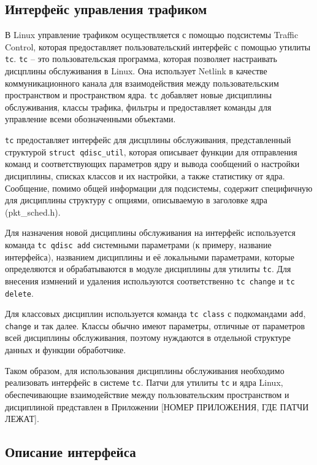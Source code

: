 	\subsection{Интерфейс управления трафиком}

	В Linux управление трафиком осуществляется с помощью подсистемы Traffic Control,
	которая предоставляет пользовательский интерфейс с помощью утилиты \texttt{tc}.
	\texttt{tc} -- это пользовательская программа, которая позволяет настраивать
	дисцплины обслуживания в Linux. Она использует Netlink в качестве
	коммуникационного канала для взаимодействия между пользовательским
	пространством и пространством ядра. \texttt{tc} добавляет новые дисциплины
	обслуживания, классы трафика, фильтры и предоставляет команды для
	управление всеми обозначенными объектами.\cite{tcpip}

	\texttt{tc} предоставляет интерфейс для дисцплины обслуживания,
	представленный структурой \lstinline{struct qdisc_util}, которая
	описывает функции для отправления команд и соответствующих параметров ядру
	и вывода сообщений о настройки дисциплины, списках классов и их настройки, а
	также статистику от ядра. Сообщение, помимо общей информации для подсистемы,
	содержит специфичную для дисциплины структуру с опциями, описываемую
	в заголовке ядра (pkt\_sched.h). 

	Для назначения новой дисциплины обслуживания на интерфейс используется
	команда \lstinline{tc qdisc add} системными параметрами (к примеру, название
	интерфейса), названием дисциплины и её локальными параметрами, которые
	определяются и обрабатываются в модуле дисциплины для утилиты \texttt{tc}. 
	Для внесения измнений и удаления используются соответственно \lstinline{tc change}
	и \lstinline{tc delete}.

	Для классовых дисциплин используется команда \lstinline{tc class} с подкомандами
	\lstinline{add}, \lstinline{change} и так далее. Классы обычно имеют параметры,
	отличные от параметров всей дисциплины обслуживания, поэтому нуждаются в отдельной
	структуре данных и функции обработчике.


	Таком образом, для использования дисциплины обслуживания необходимо
	реализовать интерфейс в системе \texttt{tc}. Патчи для утилиты \texttt{tc}
	и ядра Linux, обеспечивающие взаимодействие между пользовательским пространством
	и дисциплиной представлен в Приложении [НОМЕР ПРИЛОЖЕНИЯ, ГДЕ ПАТЧИ ЛЕЖАТ]. 

	\subsection{Описание интерфейса}

